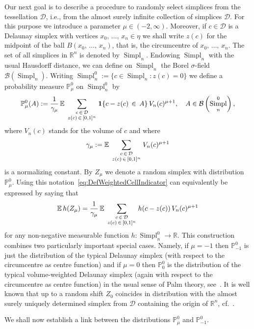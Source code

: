 \documentclass[10pt]{amsart}
\theoremstyle{definition}\newtheorem{defi}[theo]{Definition}\newtheorem{rema}[theo]{Remark}\newtheorem{exam}[theo]{Example}\newtheorem{exem}[theo]{Example}\newtheorem{nota}[theo]{Notation}
\newcommand{\R}{\mathbb{R}}
\newcommand{\EE}{\mathbb{E}\,}
\newcommand{\PP}{\mathbb{P}}
\newcommand{\dscr}{\mathcal{D}}
\DeclareMathOperator{\Simpl}{Simpl}
\newcommand{\tatop}[2]{\genfrac{}{}{0pt}{1}{#1}{#2}}
\begin{document}
Our next goal is to describe a procedure to randomly select simplices from the tessellation $\dscr$, i.e., from the almost surely infinite collection of simplices $\dscr$. For this purpose we introduce a parameter $\mu\in(-2,\infty)$. Moreover, if $c\in \dscr$ is a Delaunay simplex with vertices $x_0,\,\ldots,\,x_n\in\eta$ we shall write $z(c)$ for the midpoint of the ball $B(x_0,\,\ldots,\,x_n)$, that is, the circumcentre of $x_0,\,\ldots,\,x_n$. The set of all simplices in $\R^n$ is denoted by $\Simpl_n$. Endowing $\Simpl_n$ with the usual Hausdorff distance, we can define on $\Simpl_n$ the Borel $\sigma$-field $\mathcal{B}(\Simpl_n)$. Writing \linebreak$\Simpl_n^0:=\{c\in\Simpl_n:z(c)=0\}$ we define a probability measure $\PP_\mu^0$ on $\Simpl_n^0$ by
\begin{equation}\label{eq:DefWeightedCellIndicator}
\PP_\mu^0(A) := \frac{1}{\gamma_\mu}\,\EE\sum_{\tatop{c\,\in\,\dscr}{z(c)\,\in\,[0,1]^n}}{\bf 1}\{c-z(c)\,\in\,A\}\,V_n(c)^{\mu+1},\quad A\in\mathcal{B}\left(\Simpl_n^0\right),
\end{equation}
where $V_n(c)$ stands for the volume of $c$ and where
\[
\gamma_\mu := \EE\sum_{\tatop{c\,\in\, \dscr}{z(c)\,\in\,[0,1]^n}}V_n(c)^{\mu+1}
\]
is a normalizing constant. By $Z_\mu$ we denote a random simplex with distribution $\PP_\mu^0$. Using this notation~\eqref{eq:DefWeightedCellIndicator} can equivalently be expressed by saying that
\begin{equation}\label{eq:DefWeightedCellWithH}
\EE h(Z_\mu) = \frac{1}{\gamma_\mu}\,\EE\sum_{\tatop{c\,\in\,\dscr}{z(c)\,\in\,[0,1]^n}}h(c-z(c))\,V_n(c)^{\mu+1}
\end{equation}
for any non-negative measurable function $h:\Simpl_n^0\to\R$. This construction combines two particularly important special cases. Namely, if $\mu=-1$ then $\PP_{-1}^0$ is just the distribution of the typical Delaunay simplex (with respect to the circumcentre as centre function) and if $\mu=0$ then $\PP_{0}^0$ is the distribution of the typical volume-weighted Delaunay simplex (again with respect to the circumcentre as centre function) in the usual sense of Palm theory, see~\cite[Section~3.3]{SW08}. It is well known that up to a random shift $Z_0$ coincides in distribution with the almost surely uniquely determined simplex from $\dscr$ containing the origin of $\R^n$, cf.~\cite[Theorem~10.4.1]{SW08}.

We shall now establish a link between the distributions $\PP_\mu^0$ and $\PP_{-1}^0$.
\end{document}

